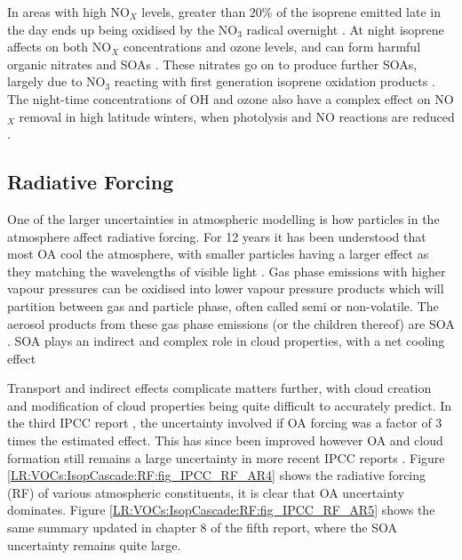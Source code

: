       In areas with high NO$_X$ levels, greater than 20\% of the isoprene emitted late in the day ends up being oxidised by the NO$_3$ radical overnight \parencite{Brown2009}.
      At night isoprene affects on both NO$_X$ concentrations and ozone levels, and can form harmful organic nitrates and SOAs \parencite{Brown2009, Mao2013}.
      These nitrates go on to produce further SOAs, largely due to NO$_3$ reacting with first generation isoprene oxidation products \parencite{Rollins2009}.
      The night-time concentrations of OH and ozone also have a complex effect on NO$_X$ removal in high latitude winters, when photolysis and NO reactions are reduced \parencite{Ayers2006}.
      
  \subsection{Radiative Forcing}
    \label{LR:VOCs:IsopCascade:RF}
    
    One of the larger uncertainties in atmospheric modelling is how particles in the atmosphere affect radiative forcing.
    For 12 years it has been understood that most OA cool the atmosphere, with smaller particles having a larger effect as they matching the wavelengths of visible light \parencite{Kanakidou2005}.
    Gas phase emissions with higher vapour pressures can be oxidised into lower vapour pressure products which will partition between gas and particle phase, often called semi or non-volatile. 
    The aerosol products from these gas phase emissions (or the children thereof) are SOA \parencite{Kanakidou2005}.
    SOA plays an indirect and complex role in cloud properties, with a net cooling effect \parencite[Chapter 7,8]{IPCC_AR5_WG1}
    
    Transport and indirect effects complicate matters further, with cloud creation and modification of cloud properties being quite difficult to accurately predict.
    In the third IPCC report \parencite{IPCC2001}, the uncertainty involved if OA forcing was a factor of 3 times the estimated effect. 
    This has since been improved however OA and cloud formation still remains a large uncertainty in more recent IPCC reports \parencite{IPCC_Chapter2}.
    Figure \ref{LR:VOCs:IsopCascade:RF:fig_IPCC_RF_AR4} shows the radiative forcing (RF) of various atmospheric constituents, it is clear that OA uncertainty dominates.
    Figure \ref{LR:VOCs:IsopCascade:RF:fig_IPCC_RF_AR5} shows the same summary updated in chapter 8 of the fifth report, where the SOA uncertainty remains quite large.
    

